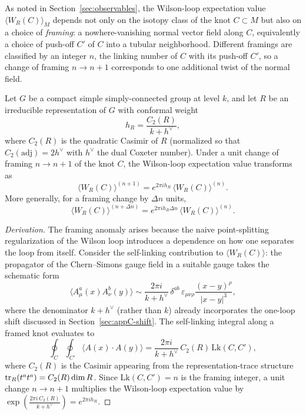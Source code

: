 As noted in Section~\ref{sec:observables}, the Wilson-loop expectation value $\langle W_R(C)\rangle_M$ depends not only on the isotopy class of the knot $C\subset M$ but also on a choice of \emph{framing}: a nowhere-vanishing normal vector field along $C$, equivalently a choice of push-off $C'$ of $C$ into a tubular neighborhood. Different framings are classified by an integer $n$, the linking number of $C$ with its push-off $C'$, so a change of framing $n\to n+1$ corresponds to one additional twist of the normal field.

\begin{theorem}\label{thm:appC-framing}
Let $G$ be a compact simple simply-connected group at level $k$, and let $R$ be an irreducible representation of $G$ with conformal weight
\begin{equation}\label{eq:appC-conformal-weight}
h_R = \frac{C_2(R)}{k + h^\vee},
\end{equation}
where $C_2(R)$ is the quadratic Casimir of $R$ (normalized so that $C_2(\mathrm{adj}) = 2h^\vee$ with $h^\vee$ the dual Coxeter number). Under a unit change of framing $n\to n+1$ of the knot $C$, the Wilson-loop expectation value transforms as
\begin{equation}\label{eq:appC-framing-phase}
\langle W_R(C)\rangle^{(n+1)} = e^{2\pi i h_R}\,\langle W_R(C)\rangle^{(n)}.
\end{equation}
More generally, for a framing change by $\Delta n$ units,
\begin{equation}\label{eq:appC-framing-general}
\langle W_R(C)\rangle^{(n+\Delta n)} = e^{2\pi i h_R \Delta n}\,\langle W_R(C)\rangle^{(n)}.
\end{equation}
\end{theorem}

\begin{proof}[Derivation]
The framing anomaly arises because the naive point-splitting regularization of the Wilson loop introduces a dependence on how one separates the loop from itself. Consider the self-linking contribution to $\langle W_R(C)\rangle$: the propagator of the Chern--Simons gauge field in a suitable gauge takes the schematic form
\begin{equation*}
\langle A_\mu^a(x) A_\nu^b(y)\rangle \sim \frac{2\pi i}{k+h^\vee}\,\delta^{ab}\,\varepsilon_{\mu\nu\rho}\frac{(x-y)^\rho}{|x-y|^3},
\end{equation*}
where the denominator $k+h^\vee$ (rather than $k$) already incorporates the one-loop shift discussed in Section~\ref{sec:appC-shift}. The self-linking integral along a framed knot evaluates to
\begin{equation*}
\oint_C \oint_{C'} \langle A(x)\cdot A(y)\rangle = \frac{2\pi i}{k+h^\vee}\,C_2(R)\,\mathrm{Lk}(C,C'),
\end{equation*}
where $C_2(R)$ is the Casimir appearing from the representation-trace structure $\operatorname{tr}_R(t^at^a) = C_2(R)\dim R$. Since $\mathrm{Lk}(C,C') = n$ is the framing integer, a unit change $n\to n+1$ multiplies the Wilson-loop expectation value by $\exp\!\left(\frac{2\pi i\, C_2(R)}{k+h^\vee}\right) = e^{2\pi i h_R}$.
\end{proof}

